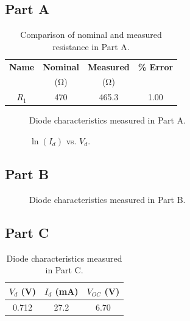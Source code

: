 \documentclass{article}
\begin{document}
\subsection{Part A}
\label{sec:result_a}

\begin{table}[hbtp]
  \centering
  \begin{tabular}{*{4}{c}}
    \textbf{Name} & \textbf{Nominal} & \textbf{Measured} & \textbf{\% Error} \\
    & (\si{\ohm}) & (\si{\ohm}) & \\
    \hline
    $R_1$ & 470 & 465.3 & 1.00 \\
  \end{tabular}
  \caption{\label{tab:percent_err} Comparison of nominal and measured resistance in Part A.}
\end{table}

\begin{figure}[hbtp]
  \centering
  
  \caption{\label{fig:part_a_graph} Diode characteristics measured in Part A.}
\end{figure}

\begin{figure}[hbtp]
  \centering
  
  \caption{\label{fig:part_a_graph2} $\ln{(I_d)}$ vs. $V_d$.}
\end{figure}

\subsection{Part B}
\label{sec:result_b}

\begin{figure}[hbtp]
  \centering
  
  \caption{\label{fig:part_b_graph} Diode characteristics measured in Part B.}
\end{figure}

\subsection{Part C}
\label{sec:result_c}

\begin{table}[hbtp]
  \centering
  \begin{tabular}{ccc}
    $V_d$ (\si{V}) & $I_d$ (\si{mA}) & $V_{OC}$ (\si{V}) \\
    \hline
    0.712 & 27.2 & 6.70 \\
  \end{tabular}
  \caption{\label{tab:part_b} Diode characteristics measured in Part C.}
\end{table}
\end{document}
